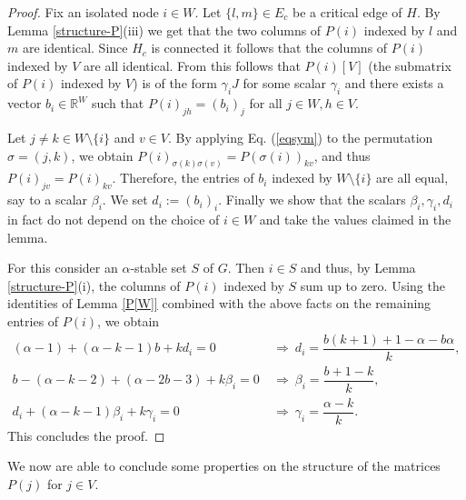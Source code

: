\documentclass[11pt]{article}
\newcommand{\oR}{{\mathbb R}}
\numberwithin{equation}{section}
\begin{document}
\begin{proof}
Fix an isolated node $i\in W$.
Let $\{l,m\}\in E_c$ be a critical edge of $H$. By Lemma \ref{structure-P}(iii) we get that the two columns of $P(i)$ indexed by $l$ and $m$ are identical. Since $H_c$ is connected it follows that the columns of $P(i)$ indexed by $V$ are all identical. From this follows that 
$P(i)[V]$ (the submatrix of $P(i)$ indexed by $V$) is of the form $\gamma_i J$ for some scalar $\gamma_i$ and there exists a vector $b_i\in \oR^{W}$ such that 
$P(i)_{j h}=(b_i)_j$ for all $j\in W, h\in V$.

Let $j\ne k\in W\setminus \{i\}$ and $v\in V$. By applying Eq. (\ref{eqsym}) to the permutation  $\sigma=(j,k)$, we obtain  
$P(i)_{\sigma(k)\sigma(v)}=P(\sigma(i))_{kv}$, and thus $P(i)_{jv}=P(i)_{kv}$. Therefore, the entries of $b_i$ indexed by $W\setminus \{i\}$ are all equal, say to a scalar $\beta_i$. We set $d_i:= (b_i)_i$. %
Finally we show that the scalars $\beta_i, \gamma_i, d_i$ in fact do not depend on the choice of $i\in W$ and take the values claimed in the lemma.

For this consider an $\alpha$-stable set $S$ of $G$. Then $i\in S$ and thus, 
 by Lemma \ref{structure-P}(i), the  columns of $P(i)$ indexed by $S$ sum up to zero. Using the identities of Lemma \ref{P[W]} combined with the above facts on the remaining entries of $P(i)$,  we obtain 
\begin{align*}
   (\alpha-1)+(\alpha-k-1)b+kd_i=0 &\ \Longrightarrow \ d_i=\dfrac{b(k+1)+1-\alpha-b\alpha}{k},\\
   b-(\alpha-k-2)+(\alpha-2b-3)+k\beta_i=0 &\ \Longrightarrow\  \beta_i=\dfrac{b+1-k}{k},\\
    d_i+(\alpha-k-1)\beta_i+k\gamma_i=0 &\ \Longrightarrow\  \gamma_i=\dfrac{\alpha-k}{k}.
\end{align*}
This concludes the proof. \end{proof}

We now are able to conclude some properties on the structure of the matrices $P(j)$ for $j\in V$.
\end{document}
